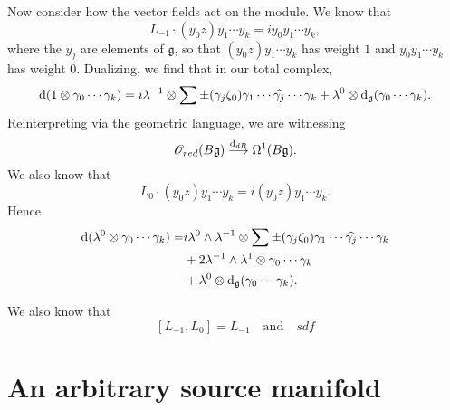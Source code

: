 \documentclass{amsart}
\def\d{{\rm d}}
\def\fg{\mathfrak g}
\def\ot{\otimes}
\def\sO{\mathscr O}
\begin{document}
Now consider how the vector fields act on the module. We know that
\[
L_{-1} \cdot (y_0 z)y_1 \cdots y_k = i y_0 y_1 \cdots y_k,
\]
where the $y_j$ are elements of $\fg$, so that $(y_0 z)y_1 \cdots y_k$ has weight $1$ and $y_0 y_1 \cdots y_k$ has weight 0. Dualizing, we find that in our total complex,
\[
\d (1 \ot \gamma_0 \cdots \gamma_k) = i \lambda^{-1} \ot \sum \pm (\gamma_j \zeta_0) \gamma_1 \cdots \widehat{\gamma_j} \cdots \gamma_k + \lambda^0 \ot \d_\fg(\gamma_0 \cdots \gamma_k).
\]
Reinterpreting via the geometric language, we are witnessing 
\[
\sO_{red}(B\fg) \overset{\d_{dR}}{\longrightarrow} \Omega^1(B\fg).
\]
We also know that
\[
L_{0} \cdot (y_0 z)y_1 \cdots y_k = i(y_0z) y_1 \cdots y_k.
\]
Hence
\begin{align*}
\d (\lambda^0 \ot \gamma_0 \cdots \gamma_k) = &i \lambda^0 \wedge \lambda^{-1} \ot \sum \pm (\gamma_j \zeta_0) \gamma_1 \cdots \widehat{\gamma_j} \cdots \gamma_k \\
&+ 2 \lambda^{-1} \wedge \lambda^{1} \ot \gamma_0 \cdots \gamma_k \\
&+ \lambda^0 \ot \d_\fg(\gamma_0 \cdots \gamma_k).
\end{align*}

We also know that
\[
[L_{-1},L_0] = L_{-1} \quad\text{and}\quad sdf
\]

\section{An arbitrary source manifold}
\end{document}
